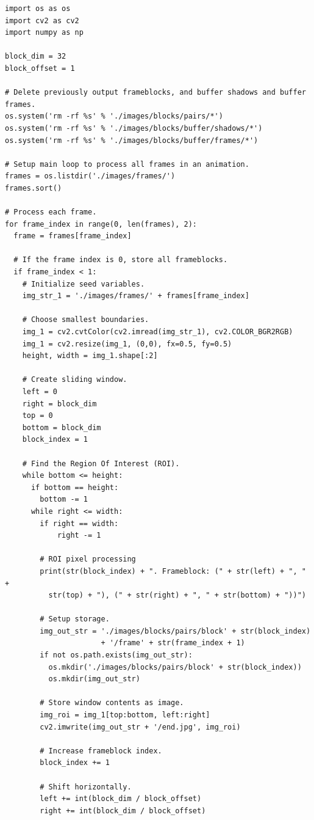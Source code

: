 \documentclass[conference]{IEEEtran}
\begin{document}
\begin{verbatim}
import os as os
import cv2 as cv2
import numpy as np

block_dim = 32
block_offset = 1

# Delete previously output frameblocks, and buffer shadows and buffer frames.
os.system('rm -rf %s' % './images/blocks/pairs/*')
os.system('rm -rf %s' % './images/blocks/buffer/shadows/*')
os.system('rm -rf %s' % './images/blocks/buffer/frames/*')

# Setup main loop to process all frames in an animation.
frames = os.listdir('./images/frames/')
frames.sort()

# Process each frame.
for frame_index in range(0, len(frames), 2):
  frame = frames[frame_index]

  # If the frame index is 0, store all frameblocks.
  if frame_index < 1:
    # Initialize seed variables.
    img_str_1 = './images/frames/' + frames[frame_index]

    # Choose smallest boundaries.
    img_1 = cv2.cvtColor(cv2.imread(img_str_1), cv2.COLOR_BGR2RGB)
    img_1 = cv2.resize(img_1, (0,0), fx=0.5, fy=0.5) 
    height, width = img_1.shape[:2]

    # Create sliding window.
    left = 0
    right = block_dim
    top = 0
    bottom = block_dim
    block_index = 1

    # Find the Region Of Interest (ROI).
    while bottom <= height:
      if bottom == height:
        bottom -= 1
      while right <= width:
        if right == width:
            right -= 1

        # ROI pixel processing
        print(str(block_index) + ". Frameblock: (" + str(left) + ", " +
          str(top) + "), (" + str(right) + ", " + str(bottom) + "))")
        
        # Setup storage.
        img_out_str = './images/blocks/pairs/block' + str(block_index)
                      + '/frame' + str(frame_index + 1)
        if not os.path.exists(img_out_str):
          os.mkdir('./images/blocks/pairs/block' + str(block_index))
          os.mkdir(img_out_str)

        # Store window contents as image.
        img_roi = img_1[top:bottom, left:right]
        cv2.imwrite(img_out_str + '/end.jpg', img_roi)

        # Increase frameblock index.
        block_index += 1
        
        # Shift horizontally.
        left += int(block_dim / block_offset)
        right += int(block_dim / block_offset)


\end{verbatim}
\end{document}
